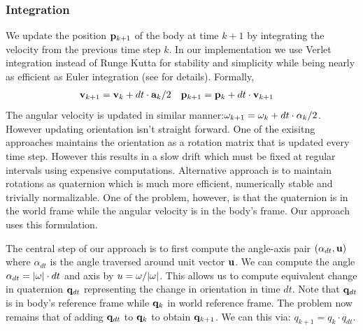 \documentclass[graybox]{svmult}
\begin{document}
\subsubsection{Integration}
We update the position ${\bf p}_{k+1}$ of the body at time $k+1$ by integrating the velocity from the previous time step $k$. In our implementation we use Verlet integration instead of Runge Kutta for stability and simplicity while being nearly as efficient as Euler integration (see \cite{butcher2016numerical} for details). Formally, 
\begin{align*}
  {\bf v}_{k+1} &= {\bf v}_{k} + dt \cdot {\bf a}_{k} / 2 &
  {\bf p}_{k+1} &= {\bf p}_{k} + dt \cdot {\bf v}_{k+1}
\end{align*}
The angular velocity is updated in similar manner:${\bf \omega}_{k+1} = {\bf \omega}_{k} + dt \cdot {\bf \alpha}_{k} / 2$. However updating orientation isn't straight forward. One of the exisitng approaches maintains the orientation as a rotation matrix that is updated every time step. However this results in a slow drift which must be fixed at regular intervals using expensive computations. Alternative approach is to maintain rotations as quaternion which is much more efficient, numerically stable and trivially normalizable. One of the problem, however, is that the quaternion is in the world frame while the angular velocity is in the body's frame. Our approach uses this formulation.

The central step of our approach is to first compute the angle-axis pair $(\alpha_{dt}, {\bf u})$ where $\alpha_{dt}$ is the angle traversed around unit vector ${\bf u}$. We can compute the angle $\alpha_{dt} = |{\bf \omega}| \cdot dt$ and axis by $u = {\bf \omega} / |\omega|$. This allows us to compute equivalent change in quaternion ${\bf q}_{dt}$ representing the change in orientation in time $dt$. Note that ${\bf q}_{dt}$ is in body's reference frame while ${\bf q}_{k}$ in world reference frame. The problem now remains that of adding ${\bf q}_{dt}$ to ${\bf q}_{k}$ to obtain ${\bf q}_{k+1}$. We can this via: $q_{k+1} = q_{k} \cdot q_{dt}$.
%
%
%
%
\end{document}
